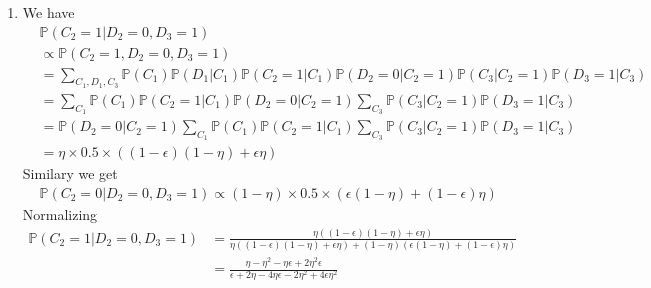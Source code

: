\documentclass[12pt]{article}
\begin{document}
\begin{enumerate}[label=(\alph*)]
	\item
	We have
	\begin{align*}
		&\mathbb{P}(C_2 = 1 | D_2 = 0, D_3 = 1) \\
		&\propto \mathbb{P}(C_2 = 1, D_2 = 0, D_3 = 1) \\
		&=\sum_{C_1, D_1, C_3} \mathbb{P}(C_1) \mathbb{P}(D_1|C_1) \mathbb{P}(C_2 = 1|C_1) \mathbb{P}(D_2 = 0|C_2 = 1) \mathbb{P}(C_3|C_2 = 1) \mathbb{P}(D_3 = 1|C_3) \\
		&=\sum_{C_1} \mathbb{P}(C_1) \mathbb{P}(C_2 = 1|C_1) \mathbb{P}(D_2 = 0|C_2 = 1) \sum_{C_3}\mathbb{P}(C_3|C_2 = 1) \mathbb{P}(D_3 = 1|C_3) \\
		&=\mathbb{P}(D_2 = 0|C_2 = 1) \sum_{C_1} \mathbb{P}(C_1) \mathbb{P}(C_2 = 1|C_1) \sum_{C_3}\mathbb{P}(C_3|C_2 = 1) \mathbb{P}(D_3 = 1|C_3) \\
		&= \eta \times 0.5 \times ((1 - \epsilon)(1 - \eta) + \epsilon\eta)
	\end{align*}
	Similary we get
	\begin{align*}
		&\mathbb{P}(C_2 = 0 | D_2 = 0, D_3 = 1) \propto (1 - \eta) \times 0.5 \times (\epsilon(1 - \eta) + (1 - \epsilon)\eta)
	\end{align*}
	Normalizing
	\begin{align*}
		\mathbb{P}(C_2 = 1 | D_2 = 0, D_3 = 1) &= \frac{\eta ((1 - \epsilon)(1 - \eta) + \epsilon\eta)}{\eta ((1 - \epsilon)(1 - \eta) + \epsilon\eta) + (1 - \eta) (\epsilon(1 - \eta) + (1 - \epsilon)\eta)} \\
		&= \frac{\eta - \eta^2 - \eta\epsilon + 2\eta^2\epsilon}{\epsilon + 2\eta - 4\eta\epsilon - 2\eta^2 + 4\epsilon\eta^2}
	\end{align*}


\end{enumerate}
\end{document}
